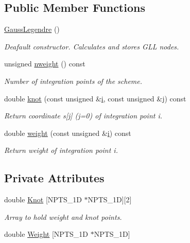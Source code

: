 \subsection*{Public Member Functions}
\begin{DoxyCompactItemize}
\item 
\hyperlink{classoomph_1_1GaussLegendre_3_012_00_01NPTS__1D_01_4_a1457debc6ebc05fbfc09392b3488463f}{Gauss\+Legendre} ()
\begin{DoxyCompactList}\small\item\em Deafault constructor. Calculates and stores G\+LL nodes. \end{DoxyCompactList}\item 
unsigned \hyperlink{classoomph_1_1GaussLegendre_3_012_00_01NPTS__1D_01_4_a5d7decc01653676a3a0a8c967bf17f9f}{nweight} () const
\begin{DoxyCompactList}\small\item\em Number of integration points of the scheme. \end{DoxyCompactList}\item 
double \hyperlink{classoomph_1_1GaussLegendre_3_012_00_01NPTS__1D_01_4_aa06ad7b9d8c9100a033021bf0478fd93}{knot} (const unsigned \&\hyperlink{cfortran_8h_adb50e893b86b3e55e751a42eab3cba82}{i}, const unsigned \&j) const
\begin{DoxyCompactList}\small\item\em Return coordinate s\mbox{[}j\mbox{]} (j=0) of integration point i. \end{DoxyCompactList}\item 
double \hyperlink{classoomph_1_1GaussLegendre_3_012_00_01NPTS__1D_01_4_a6029854a1a1a55ff0d4ac37f936cdbb6}{weight} (const unsigned \&\hyperlink{cfortran_8h_adb50e893b86b3e55e751a42eab3cba82}{i}) const
\begin{DoxyCompactList}\small\item\em Return weight of integration point i. \end{DoxyCompactList}\end{DoxyCompactItemize}
\subsection*{Private Attributes}
\begin{DoxyCompactItemize}
\item 
double \hyperlink{classoomph_1_1GaussLegendre_3_012_00_01NPTS__1D_01_4_a6641e19f354c41913bb61c745d8a595c}{Knot} \mbox{[}N\+P\+T\+S\+\_\+1D $\ast$N\+P\+T\+S\+\_\+1D\mbox{]}\mbox{[}2\mbox{]}
\begin{DoxyCompactList}\small\item\em Array to hold weight and knot points. \end{DoxyCompactList}\item 
double \hyperlink{classoomph_1_1GaussLegendre_3_012_00_01NPTS__1D_01_4_a4918e5aa95262b12f4c4767c63fa2c43}{Weight} \mbox{[}N\+P\+T\+S\+\_\+1D $\ast$N\+P\+T\+S\+\_\+1D\mbox{]}
\end{DoxyCompactItemize}
